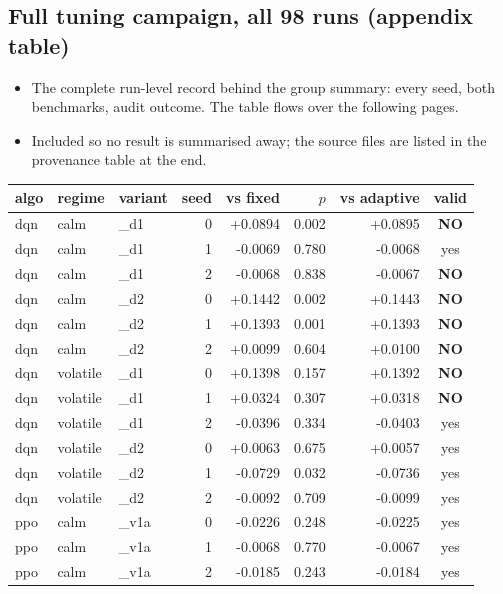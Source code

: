\documentclass[11pt]{article}
\begin{document}
\clearpage
\subsection*{Full tuning campaign, all 98 runs (appendix table)}
\begin{itemize}
\item The complete run-level record behind the group summary: every seed, both benchmarks,
audit outcome. The table flows over the following pages.
\item Included so no result is summarised away; the source files are listed in the
provenance table at the end.
\end{itemize}
\begin{center}\scriptsize%
\begin{longtable}{lllrrrrc}
\toprule
algo & regime & variant & seed & vs fixed & $p$ & vs adaptive & valid \\
\midrule
\endhead
dqn & calm & \_d1 & 0 & +0.0894 & 0.002 & +0.0895 & \textbf{NO} \\
dqn & calm & \_d1 & 1 & -0.0069 & 0.780 & -0.0068 & yes \\
dqn & calm & \_d1 & 2 & -0.0068 & 0.838 & -0.0067 & \textbf{NO} \\
dqn & calm & \_d2 & 0 & +0.1442 & 0.002 & +0.1443 & \textbf{NO} \\
dqn & calm & \_d2 & 1 & +0.1393 & 0.001 & +0.1393 & \textbf{NO} \\
dqn & calm & \_d2 & 2 & +0.0099 & 0.604 & +0.0100 & \textbf{NO} \\
dqn & volatile & \_d1 & 0 & +0.1398 & 0.157 & +0.1392 & \textbf{NO} \\
dqn & volatile & \_d1 & 1 & +0.0324 & 0.307 & +0.0318 & \textbf{NO} \\
dqn & volatile & \_d1 & 2 & -0.0396 & 0.334 & -0.0403 & yes \\
dqn & volatile & \_d2 & 0 & +0.0063 & 0.675 & +0.0057 & yes \\
dqn & volatile & \_d2 & 1 & -0.0729 & 0.032 & -0.0736 & yes \\
dqn & volatile & \_d2 & 2 & -0.0092 & 0.709 & -0.0099 & yes \\
ppo & calm & \_v1a & 0 & -0.0226 & 0.248 & -0.0225 & yes \\
ppo & calm & \_v1a & 1 & -0.0068 & 0.770 & -0.0067 & yes \\
ppo & calm & \_v1a & 2 & -0.0185 & 0.243 & -0.0184 & yes \\

\end{longtable}
\end{center}
\end{document}
